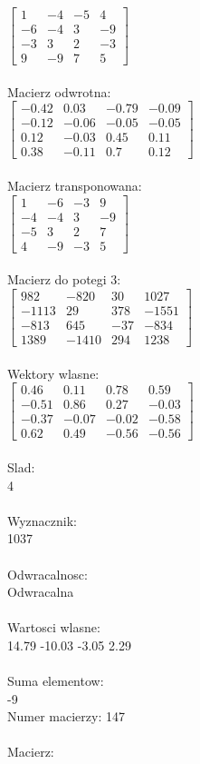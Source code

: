 \documentclass[a4paper,12pt]{article}
\begin{document}
$\begin{bmatrix} 1&-4&-5&4\\-6&-4&3&-9\\-3&3&2&-3\\9&-9&7&5 \end{bmatrix}$
\\
\\
Macierz odwrotna:\\

$\begin{bmatrix} -0.42&0.03&-0.79&-0.09\\-0.12&-0.06&-0.05&-0.05\\0.12&-0.03&0.45&0.11\\0.38&-0.11&0.7&0.12 \end{bmatrix}$
\\
\\
Macierz transponowana:\\

$\begin{bmatrix} 1&-6&-3&9\\-4&-4&3&-9\\-5&3&2&7\\4&-9&-3&5 \end{bmatrix}$
\\
\\
Macierz do potegi 3:\\

$\begin{bmatrix} 982&-820&30&1027\\-1113&29&378&-1551\\-813&645&-37&-834\\1389&-1410&294&1238 \end{bmatrix}$
\\
\\
Wektory wlasne:\\

$\begin{bmatrix} 0.46&0.11&0.78&0.59\\-0.51&0.86&0.27&-0.03\\-0.37&-0.07&-0.02&-0.58\\0.62&0.49&-0.56&-0.56 \end{bmatrix}$
\\
\\
Slad:\\
4
\\
\\
Wyznacznik:\\
1037
\\
\\
Odwracalnosc:\\
Odwracalna
\\
\\
Wartosci wlasne:\\
14.79 -10.03 -3.05 2.29
\\
\\
Suma elementow:\\
-9
\\
\newpage
Numer macierzy:
147
\\
\\
Macierz:\\
\end{document}
